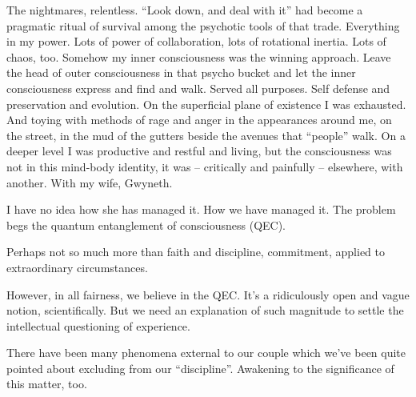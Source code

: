 

﻿The nightmares, relentless.  ``Look down, and deal with it'' had
become a pragmatic ritual of survival among the psychotic tools of
that trade.  Everything in my power.  Lots of power of collaboration,
lots of rotational inertia.  Lots of chaos, too.  Somehow my inner
consciousness was the winning approach.  Leave the head of outer
consciousness in that psycho bucket and let the inner consciousness
express and find and walk.  Served all purposes.  Self defense and
preservation and evolution.  On the superficial plane of existence I
was exhausted.  And toying with methods of rage and anger in the
appearances around me, on the street, in the mud of the gutters beside
the avenues that ``people'' walk.  On a deeper level I was productive
and restful and living, but the consciousness was not in this
mind-body identity, it was -- critically and painfully -- elsewhere,
with another.  With my wife, Gwyneth.


I have no idea how she has managed it.  How we have managed it.  The
problem begs the quantum entanglement of consciousness (QEC).


Perhaps not so much more than faith and discipline, commitment,
applied to extraordinary circumstances.


However, in all fairness, we believe in the QEC.  It's a ridiculously
open and vague notion, scientifically.  But we need an explanation of
such magnitude to settle the intellectual questioning of experience.


There have been many phenomena external to our couple which we've been
quite pointed about excluding from our ``discipline''.  Awakening to
the significance of this matter, too.

\bye

